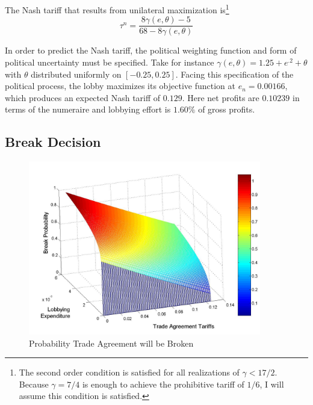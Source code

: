 \documentclass[10pt]{article}
\newcommand{\ve}{\theta}
\newcommand{\ta}{\theta}
\newcommand{\ga}{\gamma}
\begin{document}
The Nash tariff that results from unilateral maximization is\footnote{The second order condition is satisfied for all realizations of $\ga < 17/2$. Because $\ga = 7/4$ is enough to achieve the prohibitive tariff of $1/6$, I will assume this condition is satisfied.}
\[
  \tau^n = \frac{8\ga(e,\ve)-5}{68-8\ga(e,\ve)}
\]

In order to predict the Nash tariff, the political weighting function and form of political uncertainty must be specified. Take for instance $\ga(e,\ve) = 1.25 + e^{.2} + \ta$ with $\ve$ distributed uniformly on $[-0.25,0.25]$. Facing this specification of the political process, the lobby maximizes its objective function at $e_n = 0.00166$, which produces an expected Nash tariff of $0.129$. Here net profits are $0.10239$ in terms of the numeraire and lobbying effort is $1.60\%$ of gross profits.

\subsection{Break Decision}



\begin{figure}
\begin{center}
\includegraphics[height=3in, width=4in]{brprob2.jpg}
\end{center}
\caption{Probability Trade Agreement will be Broken\label{fig:br}}
\end{figure}

\end{document}
